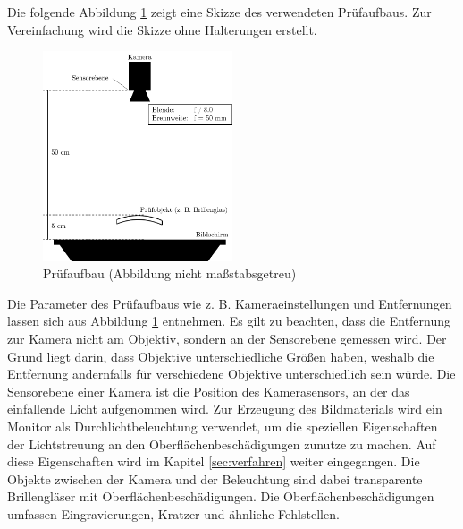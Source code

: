 Die folgende Abbildung \ref{img:pruefaufbau} zeigt eine Skizze des verwendeten Prüfaufbaus.
Zur Vereinfachung wird die Skizze ohne Halterungen erstellt.

\begin{figure}[H]
	\centering
	\includegraphics[width=0.5\textwidth]{03_sichtpruefungDurchLichtstreuung/pruefaufbau/figures/aufbau}
	\caption[Prüfaufbau]{Prüfaufbau (Abbildung nicht maßstabsgetreu)}
	\label{img:pruefaufbau}
\end{figure}

\noindent
Die Parameter des Prüfaufbaus wie z. B. Kameraeinstellungen und Entfernungen lassen sich aus Abbildung \ref{img:pruefaufbau} entnehmen.
Es gilt zu beachten, dass die Entfernung zur Kamera nicht am Objektiv, sondern an der Sensorebene gemessen wird.
Der Grund liegt darin, dass Objektive unterschiedliche Größen haben, weshalb die Entfernung andernfalls für verschiedene Objektive unterschiedlich sein würde.
Die Sensorebene einer Kamera ist die Position des Kamerasensors, an der das einfallende Licht aufgenommen wird.
Zur Erzeugung des Bildmaterials wird ein Monitor als Durchlichtbeleuchtung verwendet, um die speziellen Eigenschaften der Lichtstreuung an den Oberflächenbeschädigungen zunutze zu machen.
Auf diese Eigenschaften wird im Kapitel \ref{sec:verfahren} weiter eingegangen.
Die Objekte zwischen der Kamera und der Beleuchtung sind dabei transparente Brillengläser mit Oberflächenbeschädigungen.
Die Oberflächenbeschädigungen umfassen Eingravierungen, Kratzer und ähnliche Fehlstellen.